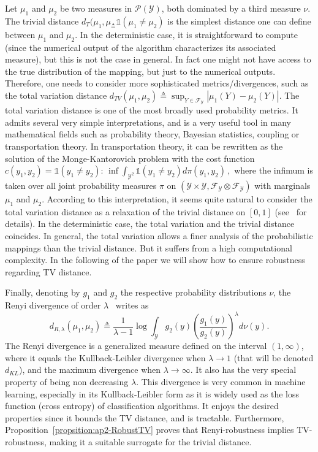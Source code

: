Let  $\mu_1$ and $\mu_2$ be two measures in $\mathcal{P}(\mathcal{Y})$, both dominated by a third measure $\nu$.
The trivial distance $ d_{T}(\mu_1,\mu_ \triangleq \mathds{1}\left(\mu_1 \neq \mu_2\right)$ is the simplest distance one can define between $\mu_1$ and $\mu_2$.
In the deterministic case, it is straightforward to compute (since the numerical output of the algorithm characterizes its associated measure), but this is not the case in general.
In fact one might not have access to the true distribution of the mapping, but just to the numerical outputs.
Therefore, one needs to consider more sophisticated metrics/divergences, such as the total variation distance $d_{TV}(\mu_1,\mu_2) \triangleq \sup_{Y \in \mathcal{F}_{\mathcal{Y}}} |\mu_1 (Y) - \mu_2(Y)|$.
The total variation distance is one of the most broadly used probability metrics.
It admits several very simple interpretations, and is a very useful tool in many mathematical fields such as probability theory, Bayesian statistics, coupling or transportation theory.
In transportation theory, it can be rewritten as the solution of the Monge-Kantorovich problem with the cost function $c(y_1,y_2) =\mathds{1}\left(y_1 \neq y_2\right)$: $ \inf\int_{\mathcal{Y}^{2}}\mathds{1}\left(y_1 \neq y_2\right) d\pi(y_1,y_2)\, ,$ where the infimum is taken over all joint probability measures $\pi$ on $(\mathcal{Y}\times \mathcal{Y}, \mathcal{F}_{\mathcal{Y} } \otimes \mathcal{F}_{\mathcal{Y}})$ with marginals $\mu_1$ and $\mu_2$.
According to this interpretation, it seems quite natural to consider the total variation distance as a relaxation of the trivial distance on $[0,1]$ (see~\cite{villani2008optimal} for details).
In the deterministic case, the total variation and the trivial distance coincides.
In general, the total variation allows a finer analysis of the probabilistic mappings than the trivial distance.
But it suffers from a high computational complexity.
In the following of the paper we will show how to ensure robustness regarding TV distance.

Finally, denoting by $g_1$ and $g_2$ the respective probability distributions \wrt $\nu$, the Renyi divergence of order $\lambda$~\cite{renyi1961} writes as  
\begin{equation}
  d_{R,\lambda}(\mu_1,\mu_2) \triangleq \frac{1}{\lambda -1}\log \int_{\mathcal{Y}} g_2(y)  \left(\frac{g_1(y)}{g_2(y)}\right)^{\lambda} d\nu(y).
\end{equation}
The Renyi divergence is a generalized measure defined on the interval $(1,\infty)$, where it equals the Kullback-Leibler divergence when $\lambda \rightarrow 1$ (that will be denoted $d_{KL}$), and the maximum divergence when $\lambda \rightarrow \infty$.
It also has the very special property of being non decreasing \wrt $\lambda$.
This divergence is very common in machine learning, especially in its Kullback-Leibler form as it is widely used as the loss function (cross entropy) of classification algorithms.
It enjoys the desired properties  since it bounds the TV distance, and is tractable.
Furthermore, Proposition~\ref{propsition:ap2-RobustTV} proves that Renyi-robustness implies TV-robustness, making it a suitable surrogate for the trivial distance. 

